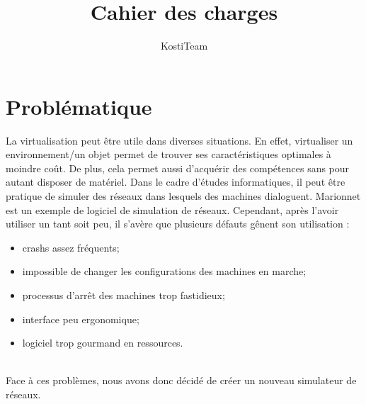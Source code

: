 \documentclass[a4paper]{article}
\author{KostiTeam}
\title{Cahier des charges}
\begin{document}
\maketitle
\newpage
\tableofcontents
\newpage

\section{Probl\'ematique}
La virtualisation peut \^etre utile dans diverses situations. En effet, virtualiser un environnement/un objet permet de trouver ses caract\'eristiques optimales à moindre coût. De plus, cela permet aussi d'acqu\'erir des comp\'etences sans pour autant disposer de mat\'eriel. Dans le cadre d'\'etudes informatiques, il peut \^etre pratique de simuler des r\'eseaux dans lesquels des machines dialoguent. Marionnet est un exemple de logiciel de simulation de r\'eseaux. Cependant, après l'avoir utiliser un tant soit peu, il s'avère que plusieurs d\'efauts g\^enent son utilisation : 
\begin{itemize}
  \item crashs assez fr\'equents;
  \item impossible de changer les configurations des machines en marche;
  \item processus d'arr\^et des machines trop fastidieux;
  \item interface peu ergonomique;
  \item logiciel trop gourmand en ressources.
\end{itemize}

\\
Face à ces problèmes, nous avons donc d\'ecid\'e de cr\'eer un nouveau simulateur de r\'eseaux.
\end{document}

